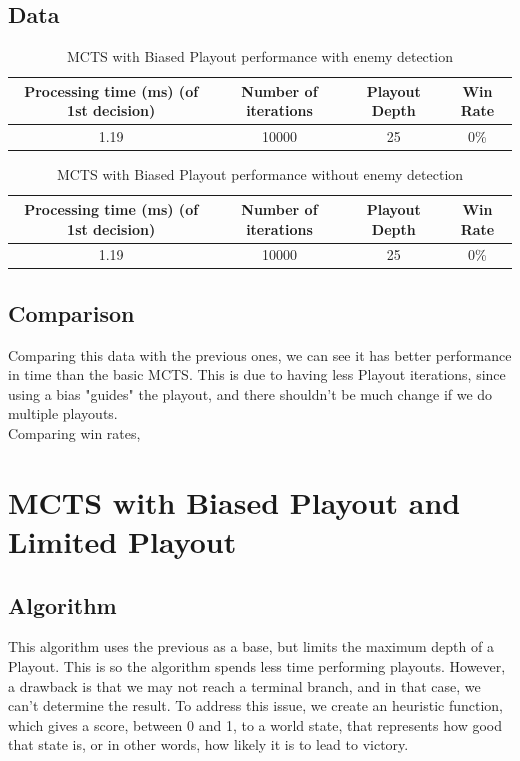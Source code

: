 \documentclass{article}
\begin{document}
  \newpage

  \subsection{Data}
  \begin{table}[h!]
    \centering
    \caption{MCTS with Biased Playout performance with enemy detection}
    \label{tab:tableBiasedMCTS1}
    \begin{tabular}{c|c|c|c}
      \textbf{Processing time (ms) (of 1st decision)} & \textbf{Number of iterations} & \textbf{Playout Depth} & \textbf{Win Rate}\\
      \hline
      1.19 & 10000 & 25 & 0\%
    \end{tabular}
  \end{table}
  \begin{table}[h!]
    \centering
    \caption{MCTS with Biased Playout performance without enemy detection}
    \label{tab:tableBiasedMCTS2}
    \begin{tabular}{c|c|c|c}
      \textbf{Processing time (ms) (of 1st decision)} & \textbf{Number of iterations} & \textbf{Playout Depth} & \textbf{Win Rate}\\
      \hline
      1.19 & 10000 & 25 & 0\%
    \end{tabular}
  \end{table}

  \subsection{Comparison}
  Comparing this data with the previous ones, we can see it has better performance in time than the basic MCTS. This is due to having less Playout iterations,
  since using a bias "guides" the playout, and there shouldn't be much change if we do multiple playouts.\\
  Comparing win rates,

  \section{MCTS with Biased Playout and Limited Playout}

  \subsection{Algorithm}
  This algorithm uses the previous as a base, but limits the maximum depth of a Playout. This is so the algorithm spends less time performing playouts. However,
  a drawback is that we may not reach a terminal branch, and in that case, we can't determine the result. To address this issue, we create an heuristic function,
  which gives a score, between 0 and 1, to a world state, that represents how good that state is, or in other words, how likely it is to lead to victory.
  
\end{document}

